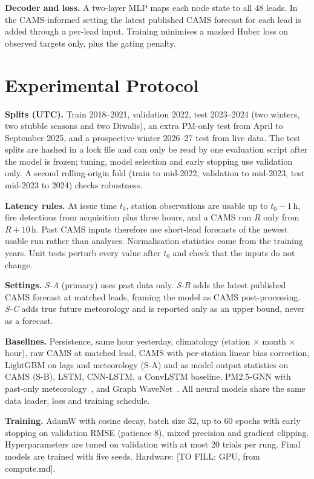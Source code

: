 \documentclass[conference]{IEEEtran}
\newcommand{\blank}[1]{{\color{red!75!black}\sffamily\footnotesize[TO FILL: #1]}}
\begin{document}
\textbf{Decoder and loss.} A two-layer MLP maps each node state to all 48 leads. In the CAMS-informed setting the latest
published CAMS forecast for each lead is added through a per-lead input. Training minimises a masked Huber loss on observed
targets only, plus the gating penalty.

\section{Experimental Protocol}
\textbf{Splits (UTC).} Train 2018--2021, validation 2022, test 2023--2024 (two winters, two stubble seasons and two
Diwalis), an extra PM-only test from April to September 2025, and a prospective winter 2026--27 test from live data. The
test splits are hashed in a lock file and can only be read by one evaluation script after the model is frozen; tuning,
model selection and early stopping use validation only. A second rolling-origin fold (train to mid-2022, validation to
mid-2023, test mid-2023 to 2024) checks robustness.

\textbf{Latency rules.} At issue time $t_0$, station observations are usable up to $t_0-1$\,h, fire detections from
acquisition plus three hours, and a CAMS run $R$ only from $R+10$\,h. Past CAMS inputs therefore use short-lead forecasts
of the newest usable run rather than analyses. Normalisation statistics come from the training years. Unit tests perturb
every value after $t_0$ and check that the inputs do not change.

\textbf{Settings.} \emph{S-A} (primary) uses past data only. \emph{S-B} adds the latest published CAMS forecast at matched
leads, framing the model as CAMS post-processing. \emph{S-C} adds true future meteorology and is reported only as an upper
bound, never as a forecast.

\textbf{Baselines.} Persistence, same hour yesterday, climatology (station $\times$ month $\times$ hour), raw CAMS at
matched lead, CAMS with per-station linear bias correction, LightGBM on lags and meteorology (S-A) and as model output
statistics on CAMS (S-B), LSTM, CNN-LSTM, a ConvLSTM baseline, PM2.5-GNN with past-only meteorology~\cite{Wang_2020}, and
Graph WaveNet~\cite{Wu_2019}. All neural models share the same data loader, loss and training schedule.

\textbf{Training.} AdamW with cosine decay, batch size 32, up to 60 epochs with early stopping on validation RMSE (patience
8), mixed precision and gradient clipping. Hyperparameters are tuned on validation with at most 20 trials per rung. Final
models are trained with five seeds. Hardware: \blank{GPU, from compute.md}.
\end{document}

